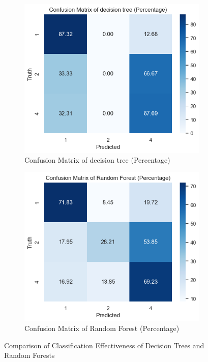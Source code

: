 \documentclass[journal]{IEEEtai}
\begin{document}
\begin{figure}[htbp]  
	\begin{subfigure}[b]{0.24\textwidth} %
		\centering  
		\includegraphics[width=\textwidth]{Confusion Matrix of decision tree.png}  
		\caption{Confusion Matrix of decision tree (Percentage)}  
	\end{subfigure}  
	\hfill %
	\begin{subfigure}[b]{0.24\textwidth}  
		\centering  
		\includegraphics[width=\textwidth]{Confusion Matrix of Random Forest.png}  
		\caption{Confusion Matrix of Random Forest (Percentage)}  
	\end{subfigure}  
	\caption{Comparison of Classification Effectiveness of Decision Trees and Random Forests} %
\end{figure}
\end{document}
